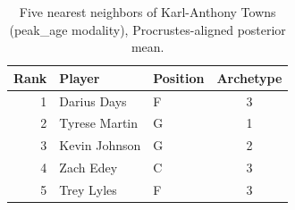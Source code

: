 \begin{table}[htbp]
  \centering\small
  \begin{tabular}{rllc}
    \toprule
    Rank & Player & Position & Archetype \\
    \midrule
    1 & Darius Days & F & 3 \\
    2 & Tyrese Martin & G & 1 \\
    3 & Kevin Johnson & G & 2 \\
    4 & Zach Edey & C & 3 \\
    5 & Trey Lyles & F & 3 \\
    \bottomrule
  \end{tabular}
  \caption{Five nearest neighbors of Karl-Anthony Towns (peak_age modality), Procrustes-aligned posterior mean.}
  \label{tab:Karl_Anthony_Towns_neighbors_peak_age}
\end{table}

